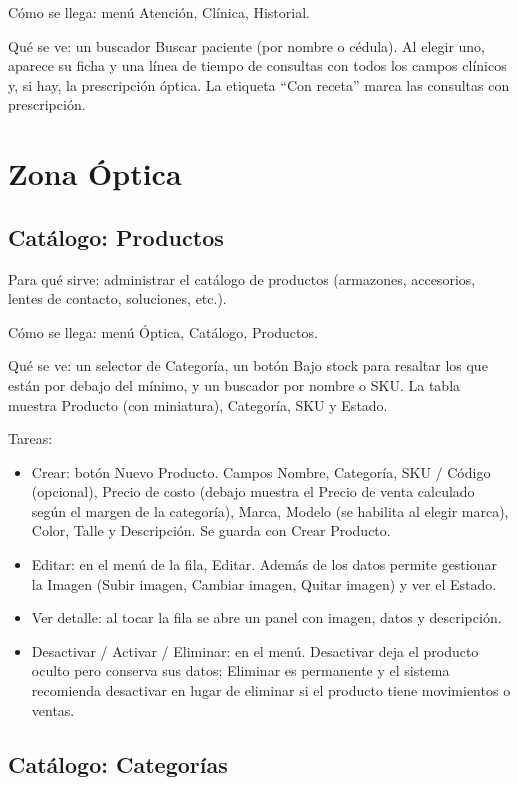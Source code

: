 Cómo se llega: menú Atención, Clínica, Historial.

Qué se ve: un buscador Buscar paciente (por nombre o cédula). Al elegir uno, aparece su ficha y una línea de tiempo de consultas con todos los campos clínicos y, si hay, la prescripción óptica. La etiqueta ``Con receta'' marca las consultas con prescripción.

\section{Zona Óptica}
\label{sec:mu-zona-optica}

\subsection{Catálogo: Productos}
\label{sec:mu-catalogo-productos}

Para qué sirve: administrar el catálogo de productos (armazones, accesorios, lentes de contacto, soluciones, etc.).

Cómo se llega: menú Óptica, Catálogo, Productos.

Qué se ve: un selector de Categoría, un botón Bajo stock para resaltar los que están por debajo del mínimo, y un buscador por nombre o SKU. La tabla muestra Producto (con miniatura), Categoría, SKU y Estado.

Tareas:
\begin{itemize}
  \item Crear: botón Nuevo Producto. Campos Nombre, Categoría, SKU / Código (opcional), Precio de costo (debajo muestra el Precio de venta calculado según el margen de la categoría), Marca, Modelo (se habilita al elegir marca), Color, Talle y Descripción. Se guarda con Crear Producto.
  \item Editar: en el menú de la fila, Editar. Además de los datos permite gestionar la Imagen (Subir imagen, Cambiar imagen, Quitar imagen) y ver el Estado.
  \item Ver detalle: al tocar la fila se abre un panel con imagen, datos y descripción.
  \item Desactivar / Activar / Eliminar: en el menú. Desactivar deja el producto oculto pero conserva sus datos; Eliminar es permanente y el sistema recomienda desactivar en lugar de eliminar si el producto tiene movimientos o ventas.
\end{itemize}

\subsection{Catálogo: Categorías}
\label{sec:mu-catalogo-categorias}

